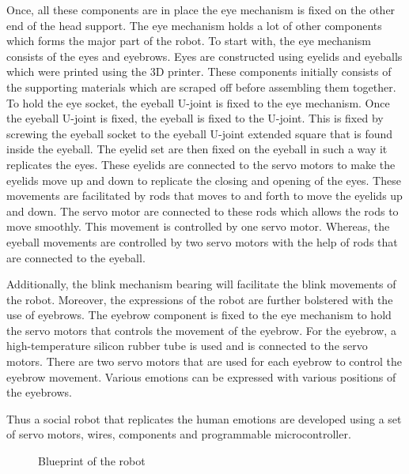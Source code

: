 \documentclass[letterpaper,12pt]{article}
\begin{document}
\begin{multicols}{2}
\par
Once, all these components are in place the eye mechanism is fixed on the other end of the head support. The eye mechanism holds a lot of other components which forms the major part of the robot. To start with, the eye mechanism consists of the eyes and eyebrows. Eyes are constructed using eyelids and eyeballs which were printed using the 3D printer. These components initially consists of the supporting materials which are scraped off before assembling them together. To hold the eye socket, the eyeball U-joint is fixed to the eye mechanism. Once the eyeball U-joint is fixed, the eyeball is fixed to the U-joint. This is fixed by screwing the eyeball socket to the eyeball U-joint extended square that is found inside the eyeball. The eyelid set are then fixed on the eyeball in such a way it replicates the eyes. These eyelids are connected to the servo motors to make the eyelids move up and down to replicate the closing and opening of the eyes. These movements are facilitated by rods that moves to and forth to move the eyelids up and down. The servo motor are connected to these rods which allows the rods to move smoothly. This movement is controlled by one servo motor. Whereas, the eyeball movements are controlled by two servo motors with the help of rods that are connected to the eyeball. \\
\par
Additionally, the blink mechanism bearing will facilitate the blink movements of the robot. Moreover, the expressions of the robot are further bolstered with the use of eyebrows. The eyebrow component is fixed to the eye mechanism to hold the servo motors that controls the movement of the eyebrow. For the eyebrow, a high-temperature silicon rubber tube is used and is connected to the servo motors. There are two servo motors that are used for each eyebrow to control the eyebrow movement. Various emotions can be expressed with various positions of the eyebrows. \\
\par
Thus a social robot that replicates the human emotions are developed using a set of servo motors, wires, components and programmable microcontroller. \\

\begin{figure}[H]
\begin{center}
\end{center}
\caption{Blueprint of the robot}
\end{figure}


\end{multicols}
\end{document}
